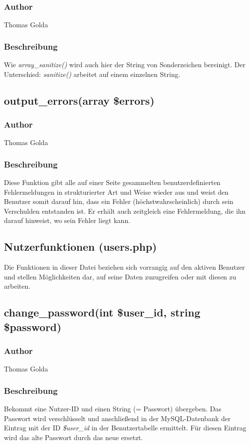 \documentclass[fontsize = 12pt, paper = a4]{scrreprt}
\begin{document}
\subsubsection*{Author}
Thomas Golda
\subsubsection*{Beschreibung}
Wie \textit{array\_sanitize()} wird auch hier der String von Sonderzeichen bereinigt. Der Unterschied: \textit{sanitize()} arbeitet auf einem einzelnen 
String.


\subsection*{output\_errors(array \$errors)}
\subsubsection*{Author}
Thomas Golda
\subsubsection*{Beschreibung}
Diese Funktion gibt alle auf einer Seite gesammelten benutzerdefinierten Fehlermeldungen in strukturierter Art und Weise wieder aus und weist den Benutzer somit darauf hin, dass ein Fehler (höchstwahrscheinlich) durch sein Verschulden entstanden ist. Er erhält auch zeitgleich eine Fehlermeldung, die ihn darauf hinweist, wo sein Fehler liegt kann.

\newpage


\subsection{Nutzerfunktionen (users.php)}
Die Funktionen in dieser Datei beziehen sich vorrangig auf den aktiven Benutzer und stellen Möglichkeiten dar, auf seine Daten zuzugreifen oder mit diesen zu arbeiten.
\subsection*{change\_password(int \$user\_id, string \$password)}
\subsubsection*{Author}
Thomas Golda
\subsubsection*{Beschreibung}
Bekommt eine Nutzer-ID und einen String (= Passwort) übergeben. Das Passwort wird verschlüsselt und anschließend in der MySQL-Datenbank der Eintrag mit der ID \textit{\$user\_id} in der Benutzertabelle ermittelt. Für diesen Eintrag wird das alte Passwort durch das neue ersetzt.
\end{document}
